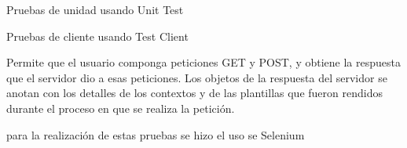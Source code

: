 Pruebas de unidad usando Unit Test

Pruebas de cliente usando Test Client

Permite que el usuario componga peticiones GET y POST, y obtiene la respuesta que el servidor dio a esas peticiones. Los objetos de la respuesta del servidor se anotan con los detalles de los contextos y de las plantillas que fueron rendidos durante el proceso en que se realiza la petición.

para la realización de estas pruebas se hizo el uso se Selenium 

%
